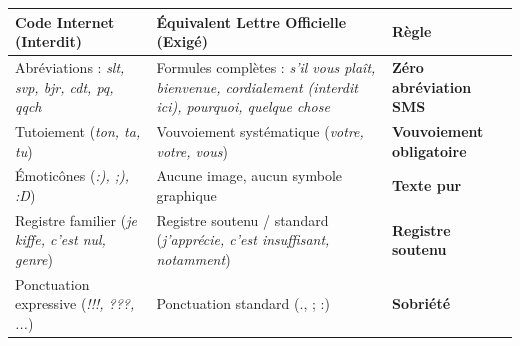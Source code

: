 \documentclass[11pt]{article}
\begin{document}
\begin{aretenir}
\begin{center}
\begin{tabularx}{\linewidth}{|l|X|X|}\hline
\textbf{Code Internet (Interdit)} & \textbf{Équivalent Lettre Officielle (Exigé)} & \textbf{Règle} \\ \hline
Abréviations : \emph{slt, svp, bjr, cdt, pq, qqch} & Formules complètes : \emph{s'il vous plaît, bienvenue, cordialement (interdit ici), pourquoi, quelque chose} & \textbf{Zéro abréviation SMS} \\ \hline
Tutoiement (\emph{ton, ta, tu}) & Vouvoiement systématique (\emph{votre, votre, vous}) & \textbf{Vouvoiement obligatoire} \\ \hline
Émoticônes (\emph{:), ;), :D}) & Aucune image, aucun symbole graphique & \textbf{Texte pur} \\ \hline
Registre familier (\emph{je kiffe, c'est nul, genre}) & Registre soutenu / standard (\emph{j'apprécie, c'est insuffisant, notamment}) & \textbf{Registre soutenu} \\ \hline
Ponctuation expressive (\emph{!!!, ???, ...}) & Ponctuation standard (., ; :) & \textbf{Sobriété} \\ \hline
\end{tabularx}
\end{center}
\end{aretenir}
\end{document}
